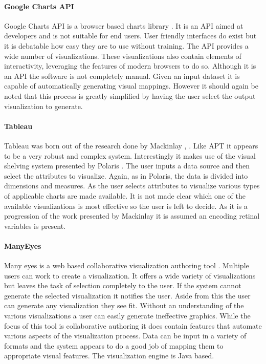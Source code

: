 \documentclass[a4paper, 11pt, titlepage, onehalfspacing]{report}
\begin{document}
\paragraph{Google Charts API}
Google Charts API is a browser based charts library \cite{gcharts}. It is an API aimed at developers and is not suitable for end users. User friendly interfaces do exist \cite{hohli} but it is debatable how easy they are to use without training. The API provides a wide number of visualizations. These visualizations also contain elements of interactivity, leveraging the features of modern browsers to do so. Although it is an API the software is not completely manual. Given an input dataset it is capable of automatically generating visual mappings. However it should again be noted that this process is greatly simplified by having the user select the output visualization to generate. 

\paragraph{Tableau}
Tableau was born out of the research done by Mackinlay \cite{tableau}, \cite{mackinlay1986automating}. Like APT it appears to be a very robust and complex system. Interestingly it makes use of the visual shelving system presented by Polaris \cite{stolte2002polaris}. The user inputs a data source and then select the attributes to visualize. Again, as in Polaris, the data is divided into dimensions and measures. As the user selects attributes to visualize various types of applicable charts are made available. It is not made clear which one of the available visualizations is most effective so the user is left to decide. As it is a progression of the work presented by Mackinlay it is assumed an encoding retinal variables is present.

\paragraph{ManyEyes}
Many eyes is a web based collaborative visualization authoring tool \cite{manyeyes}. Multiple users can work to create a visualization. It offers a wide variety of visualizations but leaves the task of selection completely to the user. If the system cannot generate the selected visualization it notifies the user. Aside from this the user can generate any visualization they see fit. Without an understanding of the various visualizations a user can easily generate ineffective graphics. While the focus of this tool is collaborative authoring it does contain features that automate various aspects of the visualization process. Data can be input in a variety of formats and the system appears to do a good job of mapping them to appropriate visual features. The visualization engine is Java based.
\end{document}
